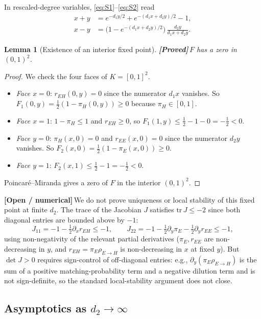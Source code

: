 \documentclass{article}
\theoremstyle{plain}
\newtheorem{lemma}{Lemma}
\theoremstyle{definition}
\newcommand{\proved}{\textcolor{provedgreen}{\textbf{[Proved]}}\,}
\newcommand{\open}{\textcolor{openred}{\textbf{[Open / numerical]}}\,}
\begin{document}
In rescaled-degree variables, \eqref{eq:S1}--\eqref{eq:S2} read
\begin{align}
x+y &= e^{-d_1 y/2}+e^{-(d_1 x+d_2 y)/2}-1, \tag{$S_1'$}\label{eq:S1prime}\\
x-y &= \bigl(1-e^{-(d_1 x+d_2 y)/2}\bigr)\,\frac{d_2 y}{d_1 x+d_2 y}. \tag{$S_2'$}\label{eq:S2prime}
\end{align}

\begin{lemma}[Existence of an interior fixed point]\label{lem:greedy-exist}
\proved $F$ has a zero in $(0,1)^2$.
\end{lemma}

\begin{proof}
We check the four faces of $K=[0,1]^2$.
\begin{itemize}
\item \emph{Face $x=0$}: $r_{EH}(0,y)=0$ since the numerator $d_1 x$ vanishes. So $F_1(0,y)=\tfrac12(1-\pi_H(0,y))\ge 0$ because $\pi_H\in[0,1]$.
\item \emph{Face $x=1$}: $1-\pi_H\le 1$ and $r_{EH}\ge 0$, so $F_1(1,y)\le \tfrac12-1-0=-\tfrac12<0$.
\item \emph{Face $y=0$}: $\pi_H(x,0)=0$ and $r_{EE}(x,0)=0$ since the numerator $d_2 y$ vanishes. So $F_2(x,0)=\tfrac12(1-\pi_E(x,0))\ge 0$.
\item \emph{Face $y=1$}: $F_2(x,1)\le \tfrac12-1=-\tfrac12<0$.
\end{itemize}
Poincar\'e--Miranda \cite{kulpa1997pm} gives a zero of $F$ in the interior $(0,1)^2$.
\end{proof}

\open We do not prove uniqueness or local stability of this fixed point at finite $d_2$. The trace of the Jacobian $J$ satisfies $\mathrm{tr}\,J\le -2$ since both diagonal entries are bounded above by $-1$:
\[
J_{11}=-1-\tfrac12\partial_x r_{EH}\le -1,\qquad J_{22}=-1-\tfrac12\partial_y\pi_E-\tfrac12\partial_y r_{EE}\le -1,
\]
using non-negativity of the relevant partial derivatives ($\pi_E,r_{EE}$ are non-decreasing in $y$, and $r_{EH}=\pi_E\rho_{E\to H}$ is non-decreasing in $x$ at fixed $y$). But $\det J>0$ requires sign-control of off-diagonal entries: e.g., $\partial_y(\pi_E\rho_{E\to H})$ is the sum of a positive matching-probability term and a negative dilution term and is not sign-definite, so the standard local-stability argument does not close.

\subsection{Asymptotics as $d_2\to\infty$}\label{ssec:greedy-d2}
\end{document}

